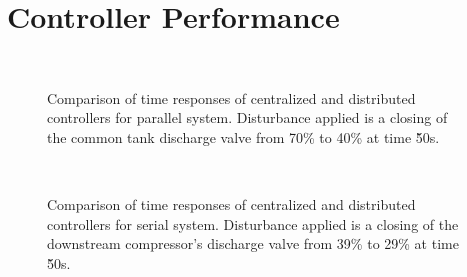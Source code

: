 \section{Controller Performance}
\label{sec:results:performance}

\begin{figure}
  \centering
  \begin{subfigure}{0.48\linewidth}
    \footnotesize
    
    \normalsize
  \end{subfigure}
  \hfill
  \begin{subfigure}{0.48\linewidth}
    \footnotesize
    
    \normalsize
  \end{subfigure}
  \\
  \begin{subfigure}{0.48\linewidth}
    \footnotesize
    
    \normalsize
  \end{subfigure}
  \hfill
  \begin{subfigure}{0.48\linewidth}
    \footnotesize
    
    \normalsize
  \end{subfigure}
  
  \caption{Comparison of time responses of centralized and distributed controllers for parallel system. Disturbance applied is a closing of the common tank discharge valve from 70\% to 40\% at time \u{50}{s}.}
  \label{fig:res:parallel_timeresp}
\end{figure}



\begin{figure}
  \centering
  \begin{subfigure}{0.48\linewidth}
    \footnotesize
    
    \normalsize
  \end{subfigure}
  \hfill
  \begin{subfigure}{0.48\linewidth}
    \footnotesize
    
    \normalsize
  \end{subfigure}
  \\
  \begin{subfigure}{0.48\linewidth}
    \footnotesize
    
    \normalsize
  \end{subfigure}
  \hfill
  \begin{subfigure}{0.48\linewidth}
    \footnotesize
    
    \normalsize
  \end{subfigure}
  
  \caption{Comparison of time responses of centralized and distributed controllers for serial system. Disturbance applied is a closing of the downstream compressor's discharge valve from 39\% to 29\% at time \u{50}{s}.}
  \label{fig:res:serial_timeresp}
\end{figure}




